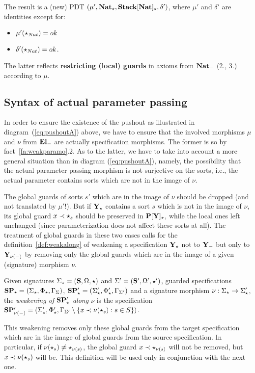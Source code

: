 The result is  a (new) PDT
 $\pdtsp{\mu'}{\delta'}{\thr{Nat_\cons}}{\thr{Stack[Nat]_\cons}}$, where
 $\mu'$ and $\delta'$ are identities except for:
	\begin{itemize}\MyLPar
	\item $\mu'(\cons_{Nat}) = ok$
	\item $\delta'(\cons_{Nat}) = ok$.
	\end{itemize}
The latter reflects {\bf restricting (local) guards} in axioms from ${\bf
 Nat}_{\weak}$ (2., 3.)
according to $\mu$.

\subsection{Syntax of actual parameter passing}\label{sub:appsyn}
In order to ensure the existence of the pushout as illustrated in
diagram~(\ref{eq:pushoutA}) above, we have to ensure that the involved morphisms $\mu$
and $\nu$ from ${\bf El}_\weak$ are actually specification morphisms. The
former is so by fact~\ref{fa:weakparamo}.2. As to the latter, we have to
take into account a more general situation than in diagram
(\ref{eq:pushoutA}), namely, the possibility that the actual parameter
passing morphism is not surjective on the sorts, i.e., the actual parameter
contains sorts which are not in the image of $\nu$. 

The global guards of sorts $s'$ which are in the image of $\nu$ should be
dropped (and not translated by $\mu'$!).
But if $\thr Y_\cons$ contains a sort $s$ which is not in the image of $\nu$, its
global guard $x\prec \cons_s$ should be preserved in $\thr{P[Y]_\cons}$,
while the local ones left unchanged (since parameterization does not affect
these sorts at all).
The treatment of global guards in these two cases calls for the 
definition~\ref{def:weakalong} of weakening a specification
$\thr{Y}_\cons$ not to $\thr{Y}_\weak$ but only to $\thr{Y}_{\nu(-)}$ by removing
only the global guards which are in the image of a given (signature)
morphism $\nu$. 

\begin{definition}\label{def:weakalong}
Given signatures $\Sigma_\cons=(\Sorts,\Ops,\cons)$ and
$\Sigma'=(\Sorts',\Ops',\cons')$, guarded specifications
$\thr{SP_\cons}=(\Sigma_\cons,\Phi_\cons,\Modax_\Sigma)$,
$\thr{SP'_\cons}=(\Sigma'_\cons,\Phi'_\cons,\Modax_{\Sigma'})$ and a
signature morphism $\nu:\Sigma_\cons\to\Sigma'_\cons$, the {\em weakening of
$\thr{SP'_\cons}$ along $\nu$} is the specification $\thr{SP'_{\nu(\weak)}} =
(\Sigma'_\cons,\Phi'_\cons,\Modax_{\Sigma'}\setminus\{x\prec\nu(\cons_s):s\in
S\})$.
\end{definition}
This weakening removes only these global guards from the target specification
which are in the image of global guards from the source specification. In
particular, if $\nu(\cons_s)\not=\cons_{\nu(s)}$, the global guard $x\prec
\cons_{\nu(s)}$ will not be removed, but $x\prec \nu(\cons_s)$ will be.
This definition will be used only in conjunction with the next one.

